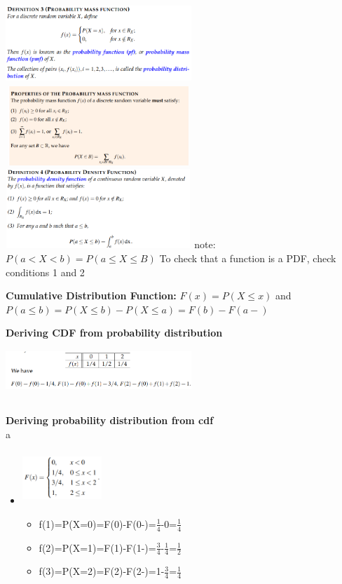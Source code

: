 \documentclass[10pt, landscape]{article}
\begin{document}
\begin{multicols}{4}
\includegraphics[width=7cm, height=3cm]{pmf.png}
\includegraphics[width=7cm, height=3cm]{pmf_properties.png}
\includegraphics[width=7cm, height=3cm]{pdf.png} \newline
note: $P(a<X<b) = P(a\le X \le B)$ \newline
To check that a function is a PDF, check conditions 1 and 2 \newline

\textbf{Cumulative Distribution Function:} $F(x)=P(X\le x)$ and $P(a \le b) = P(X \le b) - P(X \le a) = F(b) - F(a-)$ \newline

\textbf{Deriving CDF from probability distribution} \newline
\includegraphics[width=7cm, height=2.3cm]{pf_cdf.png}


\textbf{Deriving probability distribution from cdf} \\a \newline
\begin{multicols*}{2}
  \begin{itemize}
    \item[] \includegraphics[width=3cm, height=2cm]{cdf_pf.png}
    \begin{itemize}
      \item f(1)=P(X=0)=F(0)-F(0-)=$\frac{1}{4}$-0=$\frac{1}{4}$
      \item f(2)=P(X=1)=F(1)-F(1-)=$\frac{3}{4}$-$\frac{1}{4}$=$\frac{1}{2}$
      \item f(3)=P(X=2)=F(2)-F(2-)=1-$\frac{3}{4}$=$\frac{1}{4}$
    \end{itemize}
  \end{itemize}
\end{multicols*}


\end{multicols}
\end{document}

